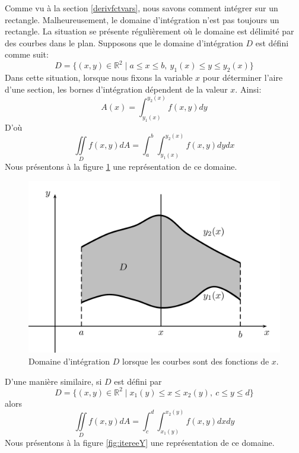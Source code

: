 \documentclass[]{book}
\theoremstyle{definition}
\theoremstyle{definition}
\theoremstyle{definition}
\theoremstyle{remark}
\begin{document}
Comme vu à la section \ref{derivfctvars}, nous savons comment intégrer
sur un rectangle. Malheureusement, le domaine d'intégration n'est pas
toujours un rectangle. La situation se présente régulièrement où le
domaine est délimité par des courbes dans le plan. Supposons que le
domaine d'intégration \(D\) est défini comme suit:
\[D=\{(x,y)\in\mathbb{R}^2\mid a\leq x\leq b,\ y_1(x)\leq y \leq y_2(x)\}\]
Dans cette situation, lorsque nous fixons la variable \(x\) pour
déterminer l'aire d'une section, les bornes d'intégration dépendent de
la valeur \(x\). Ainsi: \[A(x)=\int_{y_1(x)}^{y_2(x)}f(x,y)dy\] D'où
\[\iint\limits_D f(x,y)dA=\int_a^b \int_{y_1(x)}^{y_2(x)}f(x,y)dy dx\]
Nous présentons à la figure \ref{fig:itereeX} une représentation de ce
domaine.

\begin{figure}

{\centering \includegraphics[width=0.75\linewidth]{resources/images/latex/itereeX} 

}

\caption{Domaine d'intégration $D$ lorsque les courbes sont des fonctions de $x$.}\label{fig:itereeX}
\end{figure}

D'une manière similaire, si \(D\) est défini par
\[D=\{(x,y)\in\mathbb{R}^2\mid x_1(y)\leq x\leq x_2(y),\ c\leq y \leq d\}\]
alors
\[\iint\limits_D f(x,y)dA=\int_c^d \int_{x_1(y)}^{x_2(y)}f(x,y)dx dy\]
Nous présentons à la figure \ref{fig:itereeY} une représentation de ce
domaine.
\end{document}
